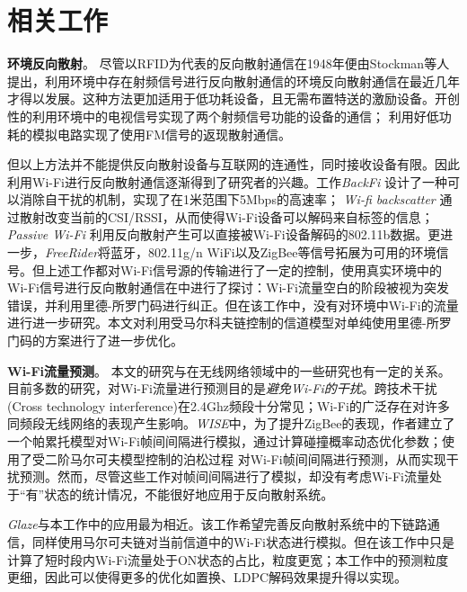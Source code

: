 
\chapter{相关工作}
\label{chap:related}

\textbf{环境反向散射}。
尽管以RFID为代表的反向散射通信在1948年便由Stockman等人提出\cite{}，利用环境中存在射频信号进行反向散射通信的环境反向散射通信在最近几年才得以发展。这种方法更加适用于低功耗设备，且无需布置特送的激励设备。\cite{}开创性的利用环境中的电视信号实现了两个射频信号功能的设备的通信；
\cite{}%
利用好低功耗的模拟电路实现了使用FM信号的返现散射通信。

但以上方法并不能提供反向散射设备与互联网的连通性，同时接收设备有限。因此利用Wi-Fi进行反向散射通信逐渐得到了研究者的兴趣。工作\textit{BackFi}
\cite{} %
设计了一种可以消除自干扰的机制，实现了在1米范围下5Mbps的高速率；
\textit{Wi-fi backscatter}\cite{}%
通过散射改变当前的CSI/RSSI，从而使得Wi-Fi设备可以解码来自标签的信息；
\textit{Passive Wi-Fi}\cite{}%
利用反向散射产生可以直接被Wi-Fi设备解码的802.11b数据。更进一步，\textit{FreeRider}将蓝牙，802.11g/n WiFi以及ZigBee等信号拓展为可用的环境信号。但上述工作都对Wi-Fi信号源的传输进行了一定的控制，使用真实环境中的Wi-Fi信号进行反向散射通信在\cite{}中进行了探讨：Wi-Fi流量空白的阶段被视为突发错误，并利用里德-所罗门码进行纠正。但在该工作中，没有对环境中Wi-Fi的流量进行进一步研究。本文对利用受马尔科夫链控制的信道模型对单纯使用里德-所罗门码的方案进行了进一步优化。

\textbf{Wi-Fi流量预测}。
本文的研究与在无线网络领域中的一些研究也有一定的关系。目前多数的研究，对Wi-Fi流量进行预测目的是\emph{避免Wi-Fi的干扰}。跨技术干扰(Cross technology interference)在2.4Ghz频段十分常见；Wi-Fi的广泛存在对许多同频段无线网络的表现产生影响。\textit{WISE}\cite{}中，为了提升ZigBee的表现，作者建立了一个帕累托模型对Wi-Fi帧间间隔进行模拟，通过计算碰撞概率动态优化参数；\cite{}使用了受二阶马尔可夫模型控制的泊松过程
对Wi-Fi帧间间隔进行预测，从而实现干扰预测。然而，尽管这些工作对帧间间隔进行了模拟，却没有考虑Wi-Fi流量处于“有”状态的统计情况，不能很好地应用于反向散射系统。

\textit{Glaze}\cite{}与本工作中的应用最为相近。该工作希望完善反向散射系统中的下链路通信，同样使用马尔可夫链对当前信道中的Wi-Fi状态进行模拟。但在该工作中只是计算了短时段内Wi-Fi流量处于ON状态的占比，粒度更宽；本工作中的预测粒度更细，因此可以使得更多的优化如置换、LDPC解码效果提升得以实现。
